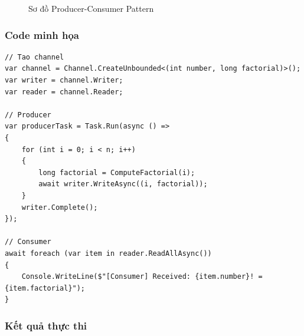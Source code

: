\documentclass[12pt,a4paper]{article}
\begin{document}
\begin{figure}[h]
\centering
{}
\caption{Sơ đồ Producer-Consumer Pattern}
\end{figure}

\subsubsection{Code minh họa}

\begin{lstlisting}[language=CSharp, caption={Factorial với Channel}]
// Tao channel
var channel = Channel.CreateUnbounded<(int number, long factorial)>();
var writer = channel.Writer;
var reader = channel.Reader;

// Producer
var producerTask = Task.Run(async () =>
{
    for (int i = 0; i < n; i++)
    {
        long factorial = ComputeFactorial(i);
        await writer.WriteAsync((i, factorial));
    }
    writer.Complete();
});

// Consumer
await foreach (var item in reader.ReadAllAsync())
{
    Console.WriteLine($"[Consumer] Received: {item.number}! = {item.factorial}");
}
\end{lstlisting}

\subsubsection{Kết quả thực thi}
\end{document}
